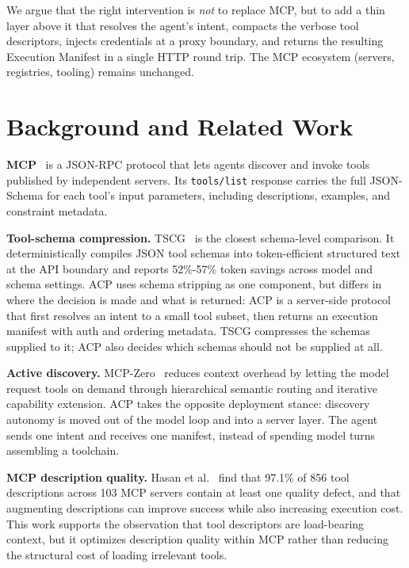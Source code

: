 \documentclass[11pt,a4paper]{article}
\begin{document}
We argue that the right intervention is \emph{not} to replace MCP, but to
add a thin layer above it that resolves the agent's intent, compacts the
verbose tool descriptors, injects credentials at a proxy boundary, and
returns the resulting Execution Manifest in a single HTTP round trip. The
MCP ecosystem (servers, registries, tooling) remains unchanged.

\section{Background and Related Work}

\textbf{MCP}~\cite{mcp} is a JSON-RPC protocol that lets agents discover and
invoke tools published by independent servers. Its \texttt{tools/list}
response carries the full JSON-Schema for each tool's input parameters,
including descriptions, examples, and constraint metadata.

\textbf{Tool-schema compression.} TSCG~\cite{sakizli2026tscg} is the closest
schema-level comparison. It deterministically compiles JSON tool schemas into
token-efficient structured text at the API boundary and reports 52\%-57\%
token savings across model and schema settings. ACP uses schema stripping as
one component, but differs in where the decision is made and what is returned:
ACP is a server-side protocol that first resolves an intent to a small tool
subset, then returns an execution manifest with auth and ordering metadata.
TSCG compresses the schemas supplied to it; ACP also decides which schemas
should not be supplied at all.

\textbf{Active discovery.} MCP-Zero~\cite{fei2025mcpzero} reduces context
overhead by letting the model request tools on demand through hierarchical
semantic routing and iterative capability extension. ACP takes the opposite
deployment stance: discovery autonomy is moved out of the model loop and into
a server layer. The agent sends one intent and receives one manifest, instead
of spending model turns assembling a toolchain.

\textbf{MCP description quality.} Hasan et al.~\cite{hasan2026smelly} find
that 97.1\% of 856 tool descriptions across 103 MCP servers contain at least
one quality defect, and that augmenting descriptions can improve success while
also increasing execution cost. This work supports the observation that tool
descriptors are load-bearing context, but it optimizes description quality
within MCP rather than reducing the structural cost of loading irrelevant
tools.
\end{document}
